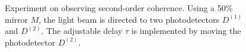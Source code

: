 \begin{figure}
\centering



\caption{Experiment on observing second-order coherence. Using a 50\% mirror $M$, the light beam is directed to two photodetectors $D^{(1)}$ and $D^{(2)}$. The adjustable delay $\tau$ is implemented by moving the photodetector $D^{(2)}$.}
\label{figPart4Ch2_4}
\end{figure}
